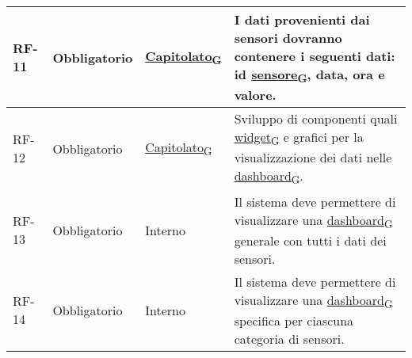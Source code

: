 \begin{longtable}{|>{\centering\arraybackslash}m{}|>{\centering\arraybackslash}m{}|>{\centering\arraybackslash}m{}|>{\centering\arraybackslash}m{}|}
	RF-11           & Obbligatorio        & \href{https://7last.github.io/docs/rtb/documentazione-interna/glossario\#capitolato}{Capitolato\textsubscript{G}} & I dati provenienti dai sensori dovranno contenere i seguenti dati: id \href{https://7last.github.io/docs/rtb/documentazione-interna/glossario\#sensore}{sensore\textsubscript{G}}, data, ora e valore.                                                                                                                                                                                                                                                                                               \\\hline
	RF-12           & Obbligatorio        & \href{https://7last.github.io/docs/rtb/documentazione-interna/glossario\#capitolato}{Capitolato\textsubscript{G}} & Sviluppo di componenti quali \href{https://7last.github.io/docs/rtb/documentazione-interna/glossario\#widget}{widget\textsubscript{G}} e grafici per la visualizzazione dei dati nelle \href{https://7last.github.io/docs/rtb/documentazione-interna/glossario\#dashboard}{dashboard\textsubscript{G}}.                                                                                                                                                                                              \\\hline
	RF-13           & Obbligatorio        & Interno                                                                                                           & Il sistema deve permettere di visualizzare una \href{https://7last.github.io/docs/rtb/documentazione-interna/glossario\#dashboard}{dashboard\textsubscript{G}} generale con tutti i dati dei sensori.                                                                                                                                                                                                                                                                                                \\\hline
	RF-14           & Obbligatorio        & Interno                                                                                                           & Il sistema deve permettere di visualizzare una \href{https://7last.github.io/docs/rtb/documentazione-interna/glossario\#dashboard}{dashboard\textsubscript{G}} specifica per ciascuna categoria di sensori.                                                                                                                                                                                                                                                                                          \\\hline

\end{longtable}
